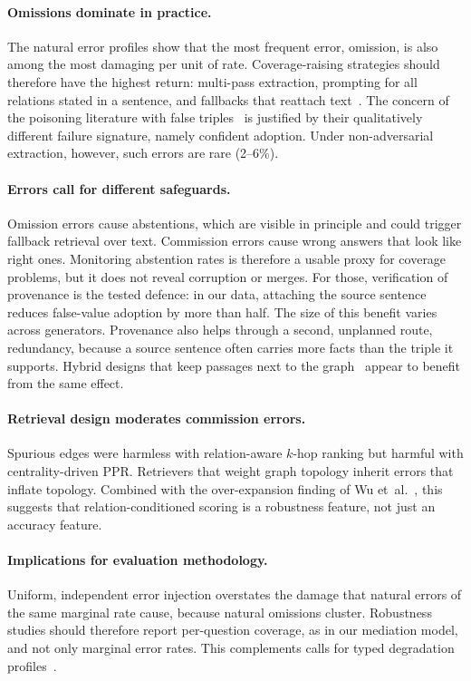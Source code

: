 \documentclass[11pt]{article}
\newcommand{\khop}{$k$-hop\xspace}
\begin{document}
\paragraph{Omissions dominate in practice.} The natural error profiles show that the most frequent error, omission, is also among the most damaging per unit of rate. Coverage-raising strategies should therefore have the highest return: multi-pass extraction, prompting for all relations stated in a sentence, and fallbacks that reattach text~\cite{huang2025tcrqf,gutierrez2025rag2memory}. The concern of the poisoning literature with false triples~\cite{wen2025fewwords,liang2025underfire} is justified by their qualitatively different failure signature, namely confident adoption. Under non-adversarial extraction, however, such errors are rare (2--6\%).

\paragraph{Errors call for different safeguards.} Omission errors cause abstentions, which are visible in principle and could trigger fallback retrieval over text. Commission errors cause wrong answers that look like right ones. Monitoring abstention rates is therefore a usable proxy for coverage problems, but it does not reveal corruption or merges. For those, verification of provenance is the tested defence: in our data, attaching the source sentence reduces false-value adoption by more than half. The size of this benefit varies across generators. Provenance also helps through a second, unplanned route, redundancy, because a source sentence often carries more facts than the triple it supports. Hybrid designs that keep passages next to the graph~\cite{gutierrez2025rag2memory} appear to benefit from the same effect.

\paragraph{Retrieval design moderates commission errors.} Spurious edges were harmless with relation-aware \khop ranking but harmful with centrality-driven PPR. Retrievers that weight graph topology inherit errors that inflate topology. Combined with the over-expansion finding of Wu et~al.~\cite{wu2026memgraphrag}, this suggests that relation-conditioned scoring is a robustness feature, not just an accuracy feature.

\paragraph{Implications for evaluation methodology.} Uniform, independent error injection overstates the damage that natural errors of the same marginal rate cause, because natural omissions cluster. Robustness studies should therefore report per-question coverage, as in our mediation model, and not only marginal error rates. This complements calls for typed degradation profiles~\cite{wang2026missdiag}.
\end{document}
